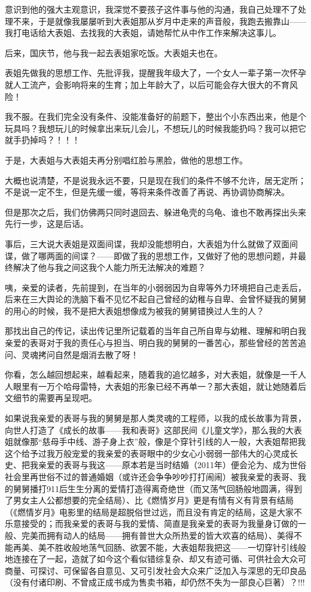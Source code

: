 \documentclass[9pt, b5paper]{article}
\begin{document}
意识到他的强大主观意识，我深觉不要孩子这件事与他的沟通，我自己处理不了处理不来，于是就像我屡屡听到大表姐那从岁月中走来的声音般，我跑去搬靠山——我打电话给大表姐、去找我的大表姐，请她帮忙从中作工作来解决这事儿。 

后来，国庆节，他与我一起去表姐家吃饭。大表姐夫也在。

表姐先做我的思想工作、先批评我，提醒我年级大了，一个女人一辈子第一次怀孕就人工流产，会影响将来的生育；加上年龄大了，以后可能会存大很大的不育风险！

我不服。在我们完全没有条件、没能准备好的前题下，整出个小东西出来，他是个玩具吗？我想玩儿的时候拿出来玩儿会儿，不想玩儿的时候我能扔吗？我可以把它就手扔掉吗？！！！

于是，大表姐与大表姐夫再分别唱红脸与黑脸，做他的思想工作。

大概也说清楚，不是说我永远不要，只是现在我们的条件不够不允许，居无定所；不是说一定不生，但是先缓一缓，等将来条件改善了再说、再协调协商解决。

但是那次之后，我们仿佛两只同时退回去、躲进龟壳的乌龟、谁也不敢再探出头来先行一步，这是后话。 

事后，三大说大表姐是双面间谍，我却没能想明白，大表姐为什么就做了双面间谍，做了哪两面的间谍？——即做了我的思想工作，又做好了他的思想问题，并最终解决了他与我之间这我个人能力所无法解决的难题？

咦，亲爱的读者，先前提到，在当年的小弱弱因为自卑等外力环境把自己走丢后，后来在三大舆论的洗脑下看不见忆不起自己曾经的幼稚与自卑、会曾怀疑我的舅舅的用心的时候，我不是把大表姐想像成为被我的舅舅错换过人生的人？

那找出自己的传记，读出传记里所记载着的当年自己所自卑与幼稚、理解和明白我亲爱的表哥对于我的责任心与担当、明白我的舅舅的一番苦心，那些曾经的苦苦追问、灵魂拷问自然是烟消去散了呀！

你看，怎么越回想起来，越看起来，随着我的追忆越多，对大表姐，就像是一千人人眼里有一万个哈母雷特，大表姐的形象已经不再单一？那大表姐，就让她随着后文细节的需要再呈现吧。

如果说我亲爱的表哥与我的舅舅是那人类灵魂的工程师，以我的成长故事为背景，向世人打造了《成长的故事——我和表哥》这部民间《儿童文学》，那么我的大表姐就像那“慈母手中线、游子身上衣”般，像是个穿针引线的人一般，大表姐帮把我这个给予过我万般宠爱的我亲爱的表哥眼中的少女心小弱弱一部伟大的心灵成长史、把我亲爱的表哥与我这——原本若是当时结婚（2011年）便会沦为、成为世俗社会里再世俗不过的普通婚姻（或许还会争争吵吵打打闹闹）被我亲爱的表哥、我的舅舅播打911后生生分离的爱情打造得离奇绝世（而又荡气回肠般地圆满，得到了男女主人公都想要的完全结局）、比《燃情岁月》更是有情有义有背景有结局（《燃情岁月》电影里的结局是超脱俗世过远，而且没有肯定的结局，这是大家不乐意接受的；而我亲爱的表哥与我的爱情、简直是我亲爱的表哥为我量身订做的一般、完美而拥有动人的结局——拥有普世大众所热爱的皆大欢喜的结局）、美得不能再美、美不胜收般地荡气回肠、欲罢不能，大表姐帮我把这——一切穿针引线般地连接在了一起，造就了如今这个看似错综复杂、却又有迹可循、可供社会大众可商量、可探讨、可保留各自意见、又可引发社会大众来广泛加入与深思的无印良品（没有付诸印刷、不曾成正成书成为售卖书箱，却仍然不失为一部良心巨著）？!!!
\end{document}
